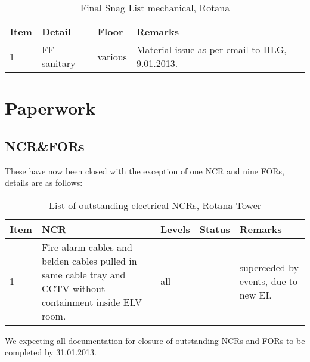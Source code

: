 \begin{table}[htbp]
\begin{tabular}{lllp{4.5cm}}
\toprule
Item &Detail &Floor  & Remarks\\
\midrule
1 &FF sanitary &various & Material issue as per email to HLG, 9.01.2013. \\
\bottomrule
\end{tabular}
\caption{Final Snag List mechanical, Rotana}

\end{table}


\section{Paperwork}

\subsection{NCR\&FORs}

These have now been closed with the exception of one NCR and nine FORs, details are as follows:

\begin{table}[htbp]
\small
\begin{tabular}{lp{3.5cm}llp{2.5cm}}
\toprule
Item &NCR & Levels & Status &Remarks\\ 
\midrule
1    &Fire alarm cables and belden cables pulled in same cable tray and CCTV without containment inside ELV room. 
& all & &superceded by events, due to new EI.\\
\bottomrule
\end{tabular}
\caption{List of outstanding electrical NCRs, Rotana Tower}
\end{table}

We expecting all documentation for closure of outstanding NCRs and FORs to be completed by 31.01.2013.
















